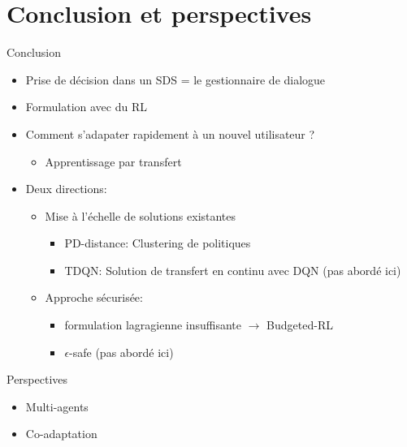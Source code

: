 \documentclass[french]{beamer}
\begin{document}
    \section{Conclusion et perspectives}
    \begin{frame}{Conclusion}
        \pause
        \begin{itemize}
            \item Prise de décision dans un SDS = le gestionnaire de dialogue
            \item Formulation avec du RL
            \pause
            \item Comment s'adapater rapidement à un nouvel utilisateur ?
            \begin{itemize}
                \item Apprentissage par transfert
            \end{itemize}
            \pause
            \item Deux directions:
            \pause
            \begin{itemize}
                \item Mise à l'échelle de solutions existantes
                \begin{itemize}
                    \item PD-distance: Clustering de politiques
                    \item TDQN: Solution de transfert en continu avec DQN (pas abordé ici)
                \end{itemize}
                \pause\item Approche sécurisée:
                \begin{itemize}
                    \item formulation lagragienne insuffisante $\rightarrow$ Budgeted-RL
                    \item $\epsilon$-safe (pas abordé ici)
                \end{itemize}
            \end{itemize}
        \end{itemize}
    \end{frame}

    \begin{frame}{Perspectives}
        \begin{itemize}
            \item  Multi-agents
            \item Co-adaptation

        \end{itemize}

    \end{frame}

\end{document}
